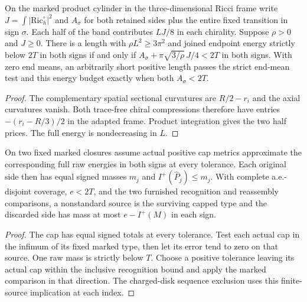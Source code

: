 \begin{proposition}
\label{prop:ed04-product-price}
\leanok
On the marked product cylinder in the three-dimensional Ricci frame write
$J=\int|\mathrm{Ric}^{\circ}_h|^2$ and $A_\sigma$ for both retained
sides plus the entire fixed transition in sign $\sigma$. Each half of
the band contributes $LJ/8$ in each chirality. Suppose $\rho>0$ and
$J\ge0$. There is a length with $\rho L^2\ge3\pi^2$ and joined
endpoint energy strictly below $2T$ in both signs if and only if
$A_\sigma+\pi\sqrt{3/\rho}\,J/4<2T$ in both signs. With zero end
means, an arbitrarily short positive length passes the strict end-mean
test and this energy budget exactly when both $A_\sigma<2T$.
\end{proposition}
\begin{proof}
\leanok
The complementary spatial sectional curvatures are $R/2-r_i$ and the
axial curvatures vanish. Both trace-free chiral compressions therefore
have entries $-(r_i-R/3)/2$ in the adapted frame. Product integration
gives the two half prices. The full energy is nondecreasing in $L$.
\end{proof}

\begin{proposition}
\label{prop:ed04-fixed-cap-masses}
\leanok
On two fixed marked closures assume actual positive cap metrics approximate
the corresponding full raw energies in both signs at every tolerance.
Each original side then has equal signed masses $m_j$ and
$I^+(\widehat P_j)\le m_j$. With complete a.e.-disjoint coverage,
$e<2T$, and the two furnished recognition and reassembly comparisons,
a nonstandard source is the surviving capped type and the discarded
side has mass at most $e-I^+(M)$ in each sign.
\end{proposition}
\begin{proof}
\leanok
The cap has equal signed totals at every tolerance. Test each actual
cap in the infimum of its fixed marked type, then let its error tend
to zero on that source. One raw mass is strictly below $T$. Choose a
positive tolerance leaving its actual cap within the inclusive recognition
bound and apply the marked comparison in that direction. The charged-disk
sequence exclusion uses this finite-source implication at each index.
\end{proof}

